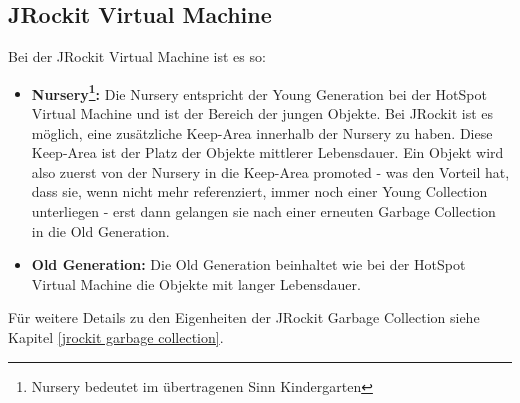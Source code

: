 \subsection{JRockit Virtual Machine}
Bei der JRockit Virtual Machine ist es so:
\begin{itemize}
	\item \textbf{Nursery\footnote{Nursery bedeutet im übertragenen Sinn Kindergarten}:} Die Nursery entspricht der Young Generation bei der HotSpot Virtual Machine und ist der Bereich der jungen Objekte. Bei JRockit ist es möglich, eine zusätzliche Keep-Area innerhalb der Nursery zu haben. Diese Keep-Area ist der Platz der Objekte mittlerer Lebensdauer. Ein Objekt wird also zuerst von der Nursery in die Keep-Area promoted - was den Vorteil hat, dass sie, wenn nicht mehr referenziert, immer noch einer Young Collection unterliegen - erst dann gelangen sie nach einer erneuten Garbage Collection in die Old Generation.
	\item \textbf{Old Generation: } Die Old Generation beinhaltet wie bei der HotSpot Virtual Machine die Objekte mit langer Lebensdauer.
\end{itemize}
Für weitere Details zu den Eigenheiten der JRockit Garbage Collection siehe Kapitel \ref{jrockit garbage collection}.


